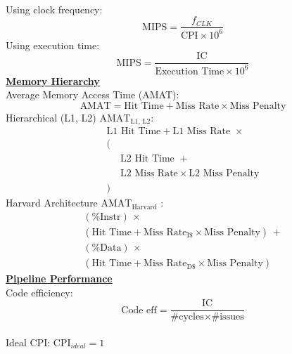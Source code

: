 \documentclass[a4paper,12pt]{article}
\begin{document}
\begin{multicols}{2}
    \\
    Using clock frequency:
    \begin{equation*}
        \text{MIPS} = \dfrac{f_{CLK}}{\text{CPI} \times 10^6}
    \end{equation*}
    Using execution time:
    \begin{equation*}
        \text{MIPS} = \dfrac{\text{IC}}{\text{Execution Time} \times 10^6}
    \end{equation*}
    \textbf{\underline{Memory Hierarchy}}
    \\
    Average Memory Access Time (AMAT):
    \begin{equation*}
        \text{AMAT} = \text{Hit Time} + \text{Miss Rate} \times \text{Miss Penalty}
    \end{equation*}
    Hierarchical (L1, L2) $\text{AMAT}_{\text{L1, L2}}$:
    \begin{equation*}
        \begin{array}{l}
            \text{L1 Hit Time} + \text{L1 Miss Rate } \times \\
            ( \\
             \phantom{(}\quad\text{L2 Hit Time } + \\
             \phantom{(}\quad \text{L2 Miss Rate} \times \text{L2 Miss Penalty} \\
            )
        \end{array}
    \end{equation*}
    Harvard Architecture $\text{AMAT}_{\text{Harvard}}$ :
    \begin{equation*}
        \begin{array}{l}
             (\%\text{Instr})\, \times \\ [.5em]
             (\text{Hit Time} + \text{Miss Rate}_{\text{I}\$} \times \text{Miss Penalty})\, + \\ [.5em]
             (\%\text{Data})\, \times \\ [.5em]
             (\text{Hit Time} + \text{Miss Rate}_{\text{D}\$} \times \text{Miss Penalty})
        \end{array}
    \end{equation*}
    \textbf{\underline{Pipeline Performance}}
    \\
    Code efficiency:
    \begin{equation*}
        \text{Code eff} = \dfrac{\text{IC}}{\text{\# cycles} \times \text{\# issues}}
    \end{equation*}
    \\
    Ideal CPI: $\text{CPI}_{ideal} = 1$

\end{multicols}
\end{document}
